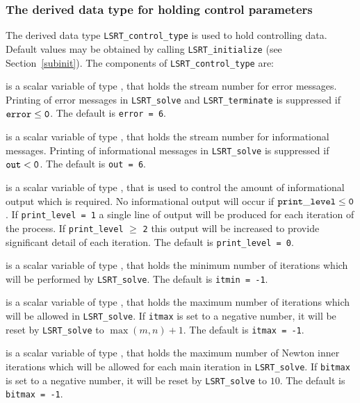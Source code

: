 \documentclass{galahad}
\newcommand{\packagename}{LS\-RT}
\begin{document}

\subsubsection{The derived data type for holding control
 parameters}\label{typecontrol}
The derived data type
{\tt \packagename\_control\_type}
is used to hold controlling data. Default values may be obtained by calling
{\tt \packagename\_initialize}
(see Section~\ref{subinit}). The components of
{\tt \packagename\_control\_type}
are:

\begin{description}
 is a scalar variable of type \integer, that holds the
stream number for error messages.
Printing of error messages in
{\tt \packagename\_solve} and {\tt \packagename\_terminate}
is suppressed if ${\tt error} \leq {\tt 0}$.
The default is {\tt error = 6}.

 is a scalar variable of type \integer, that holds the
stream number for informational messages.
Printing of informational messages in
{\tt \packagename\_solve} is suppressed if ${\tt out} < {\tt 0}$.
The default is {\tt out = 6}.

 is a scalar variable of type \integer,
that is used
to control the amount of informational output which is required. No
informational output will occur if ${\tt print\_level} \leq {\tt 0}$. If
{\tt print\_level = 1} a single line of output will be produced for each
iteration of the process. If {\tt print\_level} $\geq$ {\tt 2} this output
will be increased to provide significant detail of each iteration.
The default is {\tt print\_level = 0}.

 is a scalar variable of type \integer, that holds the
minimum number of iterations which will be performed by
{\tt \packagename\_solve}.
The default is {\tt itmin = -1}.

 is a scalar variable of type \integer, that holds the
maximum number of iterations which will be allowed in
{\tt \packagename\_solve}.
If {\tt itmax} is set to a negative number, it will be reset by
{\tt \packagename\_solve} to $\max(m,n)+1$.
The default is {\tt itmax = -1}.

 is a scalar variable of type \integer, that holds the
maximum number of Newton inner iterations which will be allowed for each
main iteration in {\tt \packagename\_solve}.
If {\tt bitmax} is set to a negative number, it will be reset by
{\tt \packagename\_solve} to $10$.
The default is {\tt bitmax = -1}.


\end{description}
\end{document}
